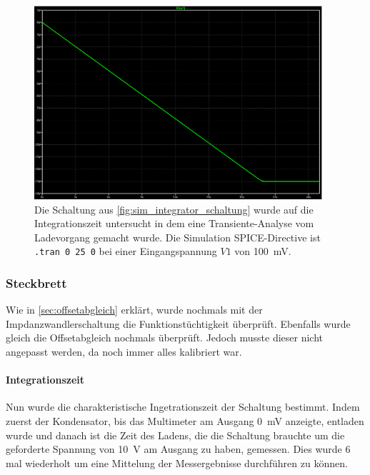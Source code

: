 \documentclass[12pt,english,ngerman]{scrartcl}
\begin{document}

\begin{figure}[H]
  \centering
    \includegraphics[width=0.95\textwidth]{./figures/integrator/sim/umkehr_int/dauer_aussteu.png}
  \caption{Die Schaltung aus \autoref{fig:sim_integrator_schaltung} wurde auf
  die Integrationszeit untersucht in dem eine Transiente-Analyse vom
  Ladevorgang gemacht wurde. Die Simulation SPICE-Directive ist \texttt{.tran 0 25 0} 
  bei einer Eingangspannung $V1$ von \SI{100}{\milli\volt}.}
  \label{fig:sim_integrator_integrationszeit}
\end{figure}

\subsubsection{Steckbrett}
Wie in \autoref{sec:offsetabgleich} erklärt, wurde nochmals mit der
Impdanzwandlerschaltung die Funktionstüchtigkeit überprüft. Ebenfalls wurde
gleich die Offsetabgleich nochmals überprüft. Jedoch musste dieser nicht
angepasst werden, da noch immer alles kalibriert war.

\paragraph{Integrationszeit}
Nun wurde die charakteristische Ingetrationszeit der Schaltung bestimmt. Indem
zuerst der Kondensator, bis das Multimeter am Ausgang \SI{0}{\mV} anzeigte,
entladen wurde und danach ist die Zeit des Ladens, die die Schaltung brauchte
um die geforderte Spannung von \SI{10}{\volt} am Ausgang zu haben, gemessen.
Dies wurde 6 mal wiederholt um eine Mittelung der Messergebnisse durchführen zu
können.
\end{document}
